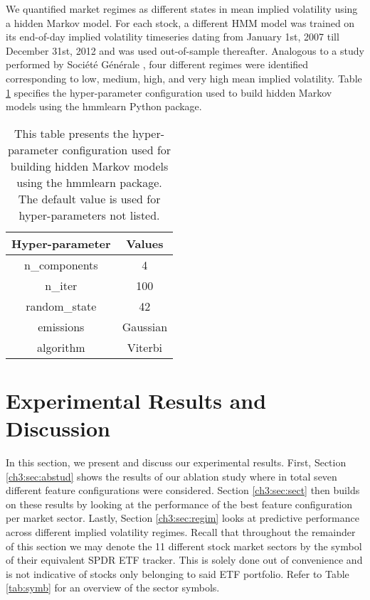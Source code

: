 \documentclass[preprint,1p, times,authoryear]{elsarticle}
\begin{document}
We quantified market regimes as different states in mean implied volatility using a hidden Markov model. For each stock, a different HMM model was trained on its end-of-day implied volatility timeseries dating from January 1st, 2007 till December 31st, 2012 and was used out-of-sample thereafter. Analogous to a study performed by Société Générale \citep{Socgen1}, four different regimes were identified corresponding to low, medium, high, and very high mean implied volatility. Table \ref{tab:hmmparams} specifies the hyper-parameter configuration used to build hidden Markov models using the hmmlearn Python package. 

\begin{table}[!htbp]
\setlength{\tabcolsep}{10pt} %
\caption{This table presents the hyper-parameter configuration used for building hidden Markov models using the hmmlearn package. The default value is used for hyper-parameters not listed. }
  \centering
\begin{tabular}{cc}
\toprule
\textbf{Hyper-parameter} & \textbf{Values} \\
\midrule
n\_components             & 4 \\
n\_iter                & 100 \\
random\_state          & 42 \\
emissions              & Gaussian \\
algorithm              & Viterbi \\
\bottomrule
\end{tabular}
\label{tab:hmmparams}
\end{table}


\section{Experimental Results and Discussion}
In this section, we present and discuss our experimental results. First, Section \ref{ch3:sec:abstud} shows the results of our ablation study where in total seven different feature configurations were considered. Section \ref{ch3:sec:sect} then builds on these results by looking at the performance of the best feature configuration per market sector. Lastly, Section \ref{ch3:sec:regim} looks at predictive performance across different implied volatility regimes. Recall that throughout the remainder of this section we may denote the 11 different stock market sectors by the symbol of their equivalent SPDR ETF tracker. This is solely done out of convenience and is not indicative of stocks only belonging to said ETF portfolio. Refer to Table \ref{tab:symb} for an overview of the sector symbols.
\end{document}
